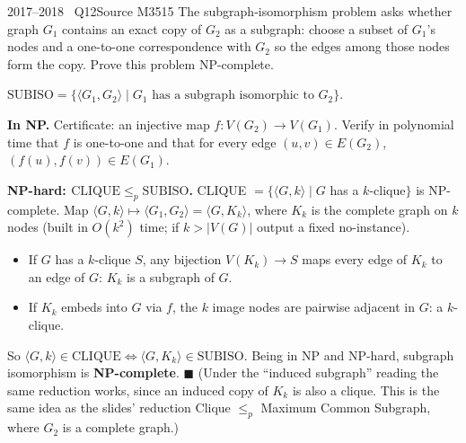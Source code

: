 \documentclass[11pt,a4paper]{article}
\begin{document}
\begin{question}{2017--2018 \textbullet\ Q12}{Source M35}{15}
The subgraph-isomorphism problem asks whether graph $G_1$ contains an exact copy of $G_2$ as a subgraph: choose a subset of $G_1$'s nodes and a one-to-one correspondence with $G_2$ so the edges among those nodes form the copy. Prove this problem NP-complete.
\end{question}
\begin{solution}
$\mathrm{SUBISO}=\{\langle G_1,G_2\rangle\mid G_1\text{ has a subgraph isomorphic to }G_2\}$.

\textbf{In NP.} Certificate: an injective map $f:V(G_2)\to V(G_1)$. Verify in polynomial time that $f$ is one-to-one and that for every edge $(u,v)\in E(G_2)$, $(f(u),f(v))\in E(G_1)$.

\textbf{NP-hard: $\mathrm{CLIQUE}\le_p\mathrm{SUBISO}$.} CLIQUE $=\{\langle G,k\rangle\mid G$ has a $k$-clique$\}$ is NP-complete. Map $\langle G,k\rangle\mapsto\langle G_1,G_2\rangle=\langle G,K_k\rangle$, where $K_k$ is the complete graph on $k$ nodes (built in $O(k^2)$ time; if $k>|V(G)|$ output a fixed no-instance).
\begin{itemize}
\item If $G$ has a $k$-clique $S$, any bijection $V(K_k)\to S$ maps every edge of $K_k$ to an edge of $G$: $K_k$ is a subgraph of $G$.
\item If $K_k$ embeds into $G$ via $f$, the $k$ image nodes are pairwise adjacent in $G$: a $k$-clique.
\end{itemize}
So $\langle G,k\rangle\in\mathrm{CLIQUE}\iff\langle G,K_k\rangle\in\mathrm{SUBISO}$. Being in NP and NP-hard, subgraph isomorphism is \textbf{NP-complete}. \hfill$\blacksquare$
(Under the ``induced subgraph'' reading the same reduction works, since an induced copy of $K_k$ is also a clique. This is the same idea as the slides' reduction Clique $\le_p$ Maximum Common Subgraph, where $G_2$ is a complete graph.)
\end{solution}
\end{document}
